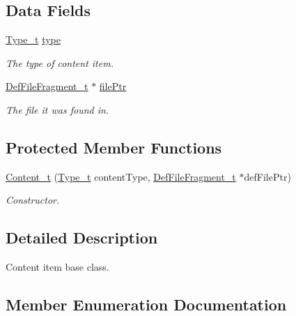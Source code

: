 \subsection*{Data Fields}
\begin{DoxyCompactItemize}
\item 
\hyperlink{struct_content__t_a9ba94026278eb679d8d42d28725b0eae}{Type\+\_\+t} \hyperlink{struct_content__t_a425ca8053dc9acd7555ea9fff664eb97}{type}
\begin{DoxyCompactList}\small\item\em The type of content item. \end{DoxyCompactList}\item 
\hyperlink{struct_def_file_fragment__t}{Def\+File\+Fragment\+\_\+t} $\ast$ \hyperlink{struct_content__t_a5a292ff88ad990d4dd6a04f10239d7a9}{file\+Ptr}
\begin{DoxyCompactList}\small\item\em The file it was found in. \end{DoxyCompactList}\end{DoxyCompactItemize}
\subsection*{Protected Member Functions}
\begin{DoxyCompactItemize}
\item 
\hyperlink{struct_content__t_a759c4293cd3ae0d26d52c5fd1119462a}{Content\+\_\+t} (\hyperlink{struct_content__t_a9ba94026278eb679d8d42d28725b0eae}{Type\+\_\+t} content\+Type, \hyperlink{struct_def_file_fragment__t}{Def\+File\+Fragment\+\_\+t} $\ast$def\+File\+Ptr)
\begin{DoxyCompactList}\small\item\em Constructor. \end{DoxyCompactList}\end{DoxyCompactItemize}


\subsection{Detailed Description}
Content item base class. 

\subsection{Member Enumeration Documentation}
